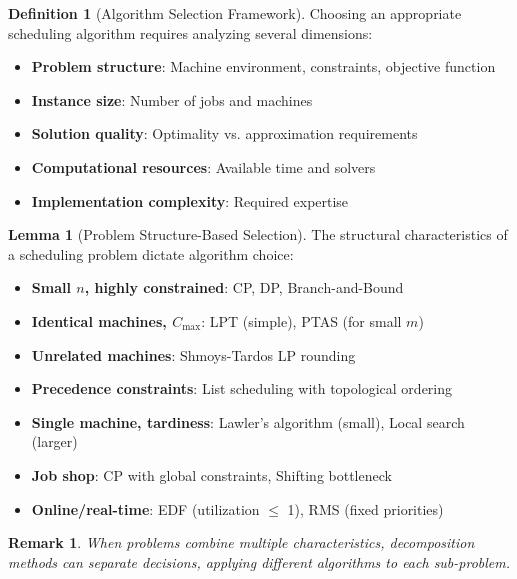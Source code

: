 \documentclass{article}
\newtheorem{remark}{Remark}
\theoremstyle{definition}
\newtheorem{lemma}{Lemma}
\newtheorem{definition}{Definition}
\begin{document}
\begin{definition}[Algorithm Selection Framework]
Choosing an appropriate scheduling algorithm requires analyzing several dimensions:
\begin{itemize}
    \item \textbf{Problem structure}: Machine environment, constraints, objective function
    \item \textbf{Instance size}: Number of jobs and machines
    \item \textbf{Solution quality}: Optimality vs. approximation requirements
    \item \textbf{Computational resources}: Available time and solvers
    \item \textbf{Implementation complexity}: Required expertise
\end{itemize}
\end{definition}

\begin{lemma}[Problem Structure-Based Selection]
The structural characteristics of a scheduling problem dictate algorithm choice:

\begin{itemize}
    \item \textbf{Small $n$, highly constrained}: CP, DP, Branch-and-Bound
    \item \textbf{Identical machines, $C_{\max}$}: LPT (simple), PTAS (for small $m$)
    \item \textbf{Unrelated machines}: Shmoys-Tardos LP rounding
    \item \textbf{Precedence constraints}: List scheduling with topological ordering
    \item \textbf{Single machine, tardiness}: Lawler's algorithm (small), Local search (larger)
    \item \textbf{Job shop}: CP with global constraints, Shifting bottleneck
    \item \textbf{Online/real-time}: EDF (utilization $\leq$ 1), RMS (fixed priorities)
\end{itemize}

\begin{remark}
When problems combine multiple characteristics, decomposition methods can separate decisions, applying different algorithms to each sub-problem.
\end{remark}
\end{lemma}
\end{document}
